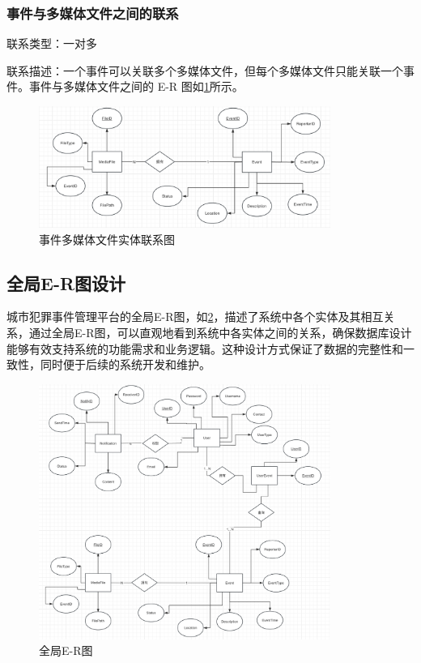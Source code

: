 \subsubsection{事件与多媒体文件之间的联系}

联系类型：一对多

联系描述：一个事件可以关联多个多媒体文件，但每个多媒体文件只能关联一个事件。事件与多媒体文件之间的 E-R 图如\cref{fig:rela-event-mediafile}所示。

\begin{figure}[htbp]
    \centering
    \includegraphics[width=0.85\textwidth]{figures/db-img-rela-03.png}
    \caption{事件多媒体文件实体联系图}
    \label{fig:rela-event-mediafile}
\end{figure}



\subsection{全局E-R图设计}

城市犯罪事件管理平台的全局E-R图，如\cref{fig:rela-tot}，描述了系统中各个实体及其相互关系，通过全局E-R图，可以直观地看到系统中各实体之间的关系，确保数据库设计能够有效支持系统的功能需求和业务逻辑。这种设计方式保证了数据的完整性和一致性，同时便于后续的系统开发和维护。

\begin{figure}[htbp]
    \centering
    \includegraphics[width=0.85\textwidth]{figures/db-img-rela-tot.png}
    \caption{全局E-R图}
    \label{fig:rela-tot}
\end{figure}
